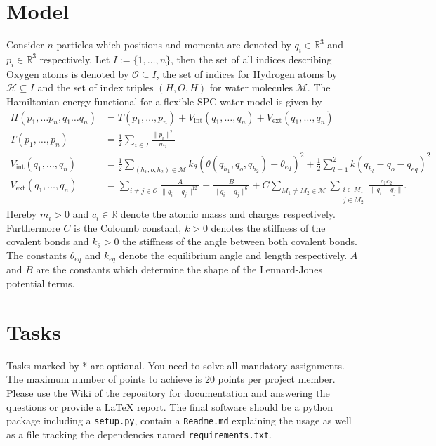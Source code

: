 \documentclass[a4paper,11pt]{amsart}
\begin{document}
\section{Model}
Consider \(n\) particles which positions and momenta are denoted by \(q_i\in \mathbb{R}^3\) and \(p_i \in \mathbb{R}^3\) respectively. 
Let \(I:=\{1,\dots,n\}\), then the set of all indices describing Oxygen atoms is denoted by \(\mathcal{O}\subseteq I\), the set 
of indices for Hydrogen atoms by \(\mathcal{H} \subseteq I\) and the set of index triples \((H,O,H)\) for water molecules \(\mathcal{M}\).
The Hamiltonian energy functional for a flexible SPC water model is given by 
\begin{align}
  H(p_1,\dots p_n, q_1 \dots q_n) &= T(p_1, \dots, p_n) + V_{\text{int}}(q_1, \dots, q_n ) + V_{\text{ext}}(q_1,\dots, q_n)\\ 
  T(p_1, \dots, p_n) &=  \frac{1}{2} \sum_{i\in I} \frac{\|p_i\|^2}{m_i} \\ 
  V_{\text{int}}(q_1, \dots, q_n) &= \frac{1}{2}\sum_{(h_1,o,h_2) \in \mathcal{M}} k_\theta {( \theta(q_{h_1},q_{o},q_{h_2}) - \theta_{eq})}^2 
  + \frac{1}{2}\sum_{l=1}^{2} k {( q_{h_l} - q_{o} - q_{eq} )}^2   \\ 
  V_{\text{ext}}(q_1, \dots, q_n) &= \sum_{i\neq j \in \mathcal{O}} \frac{A}{\|q_i-q_j\|^{12}} - \frac{B}{\|q_i-q_j\|^{6}} + C \sum_{M_1\neq M_2 \in \mathcal{M}} \sum_{\substack{i\in M_1\\ j\in M_2}} \frac{c_1 c_2}{\| q_i - q_j\|}.
\end{align} 
Hereby \(m_i>0\) and \(c_i\in \mathbb{R}\) denote the atomic masss and charges respectively.
Furthermore \(C\) is the Coloumb constant, \(k>0\) denotes the stiffness of the covalent bonds and \(k_\theta>0\) the stiffness of the angle between both covalent bonds. The constants \(\theta_{eq}\) and \(k_{eq}\) denote the equilibrium angle and length respectively.
\(A\) and \(B\) are the constants which determine the shape of the Lennard-Jones potential terms.

\section{Tasks}
Tasks marked by * are optional. You need to solve all mandatory assignments.
The maximum number of points to achieve is 20 points per project member.
Please use the Wiki of the repository for documentation and answering the
questions or provide a \LaTeX{} report. The final software should be a python
package including a \texttt{setup.py}, contain a \texttt{Readme.md}
explaining the usage as well as a file tracking the dependencies named
\texttt{requirements.txt}.
\end{document}
